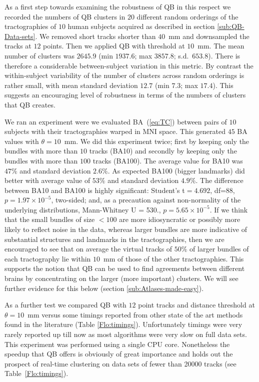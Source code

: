 \documentclass{bioinfo}
\begin{document}
As a first step towards examining the robustness of QB in this respect
we recorded the numbers of QB clusters in $20$ different random
orderings of the tractographies of $10$ human subjects acquired as
described in section \ref{sub:QB-Data-sets}. We removed short tracks
shorter than $40$~mm and downsampled the tracks at $12$ points. Then we
applied QB with threshold at $10$~mm. The mean number of clusters was
$2645.9$ (min $1937.6$; max $3857.8$; s.d.~$653.8$). There is therefore
a considerable between-subject variation in this metric. By contrast the
within-subject variability of the number of clusters across random
orderings is rather small, with mean standard deviation $12.7$ (min
$7.3$; max $17.4$). This suggests an encouraging level of robustness in
terms of the numbers of clusters that QB creates.

We ran an experiment were we evaluated BA~(\ref{eq:TC}) between pairs of
$10$ subjects with their tractographies warped in MNI space. This
generated $45$ BA values with $\theta=10$~mm. We did
this experiment twice; first by keeping only the bundles with more than
$10$ tracks (BA10) and secondly by keeping only the bundles with more
than $100$ tracks (BA100). The average value for BA10 was $47\%$ and
standard deviation $2.6\%$. As expected BA100 (bigger landmarks) did
better with average value of $53\%$ and standard deviation $4.9\%$. The
difference between BA10 and BA100 is highly significant: Student's
t$=4.692$, df=88, $p=1.97\times10^{-5}$, two-sided; and, as a precaution
against non-normality of the underlying distributions, Mann-Whitney U =
530., $p=5.65\times10^{-5}$. If we think that the small bundles of size
$<100$ are more idiosyncratic or possibly more likely to reflect noise
in the data, whereas larger bundles are more indicative of substantial
structures and landmarks in the tractographies, then we are encouraged
to see that on average the virtual tracks of $50\%$ of larger bundles of
each tractography lie within $10$~mm of those of the other
tractographies. This supports the notion that QB can be used to find
agreements between different brains by concentrating on the larger (more
important) clusters. We will see further evidence for this below
(section \ref{sub:Atlases-made-easy}).

As a further test we compared QB with $12$ point tracks and distance
threshold at $\theta=10$~mm versus some timings reported from other
state of the art methods found in the literature (Table
\ref{Flo:timings}). Unfortunately timings were very rarely reported up
till now as most algorithms were very slow on full data sets. This
experiment was performed using a single CPU core. Nonetheless the
speedup that QB offers is obviously of great importance and holds out
the prospect of real-time clustering on data sets of fewer than \num{20000}
tracks (see Table~\ref{Flo:timings}).
\end{document}
